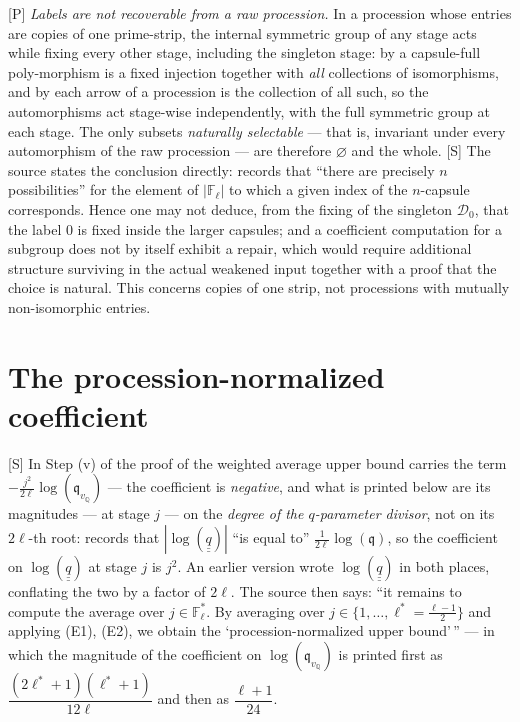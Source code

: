\documentclass[11pt]{article}
\theoremstyle{plain}
\theoremstyle{definition}
\begin{document}
\textup{[P]} \emph{Labels are not recoverable from a raw procession.}  In a
procession whose entries are copies of one prime-strip, the internal symmetric group
of any stage acts while fixing every other stage, including the singleton stage: by
\cite[\S0]{IUT1} a capsule-full poly-morphism is a fixed injection together with
\emph{all} collections of isomorphisms, and by \cite[Def.~4.10]{IUT1} each arrow of a
procession is the collection of all such, so the automorphisms act stage-wise
independently, with the full symmetric group at each stage.  The only subsets
\emph{naturally selectable} --- that is, invariant under every automorphism of the raw
procession --- are therefore $\varnothing$ and the whole.  \textup{[S]} The source
states the conclusion directly: \cite[Prop.~6.9(i)]{IUT1} records that ``there are
precisely $n$ possibilities'' for the element of $|\mathbb F_\ell|$ to which a given
index of the $n$-capsule corresponds.  Hence one may not deduce, from the fixing of the
singleton $\mathcal D_0$, that the label $0$ is fixed inside the larger capsules; and
a coefficient computation for a subgroup does not by itself exhibit a repair, which
would require additional structure surviving in the actual weakened input together
with a proof that the choice is natural.  This concerns copies of one strip, not
processions with mutually non-isomorphic entries.

\section{The procession-normalized coefficient}\label{s:calib}

\textup{[S]} In Step (v) of the proof of \cite[Thm.~1.10]{IUT4} the weighted average
upper bound carries the term $-\frac{j^2}{2\ell}\log(\mathfrak q_{v_{\mathbb Q}})$ ---
the coefficient is \emph{negative}, and what is printed below are its magnitudes ---
at stage $j$ --- on the \emph{degree of the $q$-parameter divisor}, not on its
$2\ell$-th root: \cite[p.~23]{IUT4} records that $|\log(\underline{\underline q})|$
``is equal to'' $\tfrac1{2\ell}\log(\mathfrak q)$, so the coefficient on
$\log(\underline{\underline q})$ at stage $j$ is $j^2$.  An earlier version wrote
$\log(\underline{\underline q})$ in both places, conflating the two by a factor of
$2\ell$.  The source then says: ``it remains to compute the average over
$j\in\mathbb F_\ell^{*}$.  By averaging over $j\in\{1,\dots,\ell^{*}=\frac{\ell-1}2\}$
and applying (E1), (E2), we obtain the `procession-normalized upper bound'\,'' --- in
which the magnitude of the coefficient on $\log(\mathfrak q_{v_{\mathbb Q}})$ is printed first as
$\dfrac{(2\ell^{*}+1)(\ell^{*}+1)}{12\ell}$ and then as $\dfrac{\ell+1}{24}$.
\end{document}
